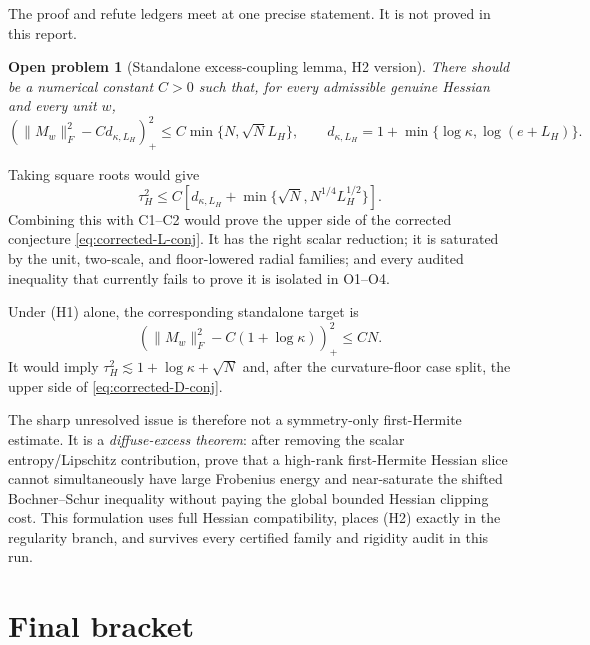 \documentclass[11pt]{article}
\numberwithin{equation}{section}
\newtheorem{openproblem}[theorem]{Open problem}
\newcommand{\pos}[1]{(#1)_+}
\begin{document}
The proof and refute ledgers meet at one precise statement.  It is not proved
in this report.

\begin{openproblem}[Standalone excess-coupling lemma, H2 version]
\label{thm:open-H2}
There should be a numerical constant $C>0$ such that, for every admissible
genuine Hessian and every unit $w$,
\begin{equation}\label{eq:open-H2}
 \boxed{
 \pos{\|M_w\|_F^2-Cd_{\kappa,L_H}}^2
 \le C\min\{N,\sqrt N L_H\},
 \qquad
 d_{\kappa,L_H}=1+\min\{\log\kappa,\log(e+L_H)\}.}
\end{equation}
\end{openproblem}

Taking square roots would give
\[
 \tau_H^2\le C\left[d_{\kappa,L_H}
 +\min\{\sqrt N,N^{1/4}L_H^{1/2}\}\right].
\]
Combining this with C1--C2 would prove the upper side of the corrected
conjecture \eqref{eq:corrected-L-conj}.  It has the right scalar reduction;
it is saturated by the unit, two-scale, and floor-lowered radial families;
and every audited inequality that currently fails to prove it is isolated in
O1--O4.

Under (H1) alone, the corresponding standalone target is
\begin{equation}\label{eq:open-H1}
 \boxed{
 \pos{\|M_w\|_F^2-C(1+\log\kappa)}^2\le CN.}
\end{equation}
It would imply
$\tau_H^2\lesssim1+\log\kappa+\sqrt N$ and, after the curvature-floor
case split, the upper side of \eqref{eq:corrected-D-conj}.

The sharp unresolved issue is therefore not a symmetry-only first-Hermite
estimate.  It is a \emph{diffuse-excess theorem}: after removing the scalar
entropy/Lipschitz contribution, prove that a high-rank first-Hermite Hessian
slice cannot simultaneously have large Frobenius energy and near-saturate
the shifted Bochner--Schur inequality without paying the global bounded
Hessian clipping cost.  This formulation uses full Hessian compatibility,
places (H2) exactly in the regularity branch, and survives every certified
family and rigidity audit in this run.

\section{Final bracket}
\end{document}
